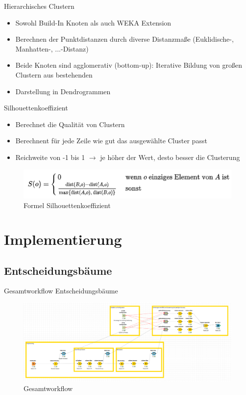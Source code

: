\documentclass[
	handout,
  	aspectratio=169
]{beamer}
\begin{document}
	\begin{frame}{Hierarchisches Clustern}
	\begin{itemize}
	\item Sowohl Build-In Knoten als auch WEKA Extension
	\item Berechnen der Punktdistanzen durch diverse Distanzmaße (Euklidische-, Manhatten-, ...-Distanz)
	\item Beide Knoten sind agglomerativ (bottom-up): Iterative Bildung von großen Clustern aus bestehenden
	\item Darstellung in Dendrogrammen
	\end{itemize}
	\end{frame}
	
	\begin{frame}{Silhouettenkoeffizient}
	\begin{itemize}
	\item Berechnet die Qualität von Clustern
	\item Berechnent für jede Zeile wie gut das ausgewählte Cluster passt
	\item Reichweite von -1 bis 1 $\rightarrow$ je höher der Wert, desto besser die Clusterung
	\end{itemize}
	\begin{center}
				\begin{figure}[h]
					\includegraphics[scale=1]{../pictures/formel.png}
					\caption{Formel Silhouettenkoeffizient}		
				\end{figure}		
			\end{center}	
	\end{frame}
	\section{Implementierung}	
	\frame{\sectionpage}
	
		\subsection{Entscheidungsbäume}
			\begin{frame}{Gesamtworkflow Entscheidungsbäume}
				\begin{center}					
					\begin{figure}[h]
						\includegraphics[scale=0.25]{../pictures/trees-workflow-gesamt.png}
						\caption{Gesamtworkflow}		
					\end{figure}	
				\end{center}	
			\end{frame}
			
\end{document}
